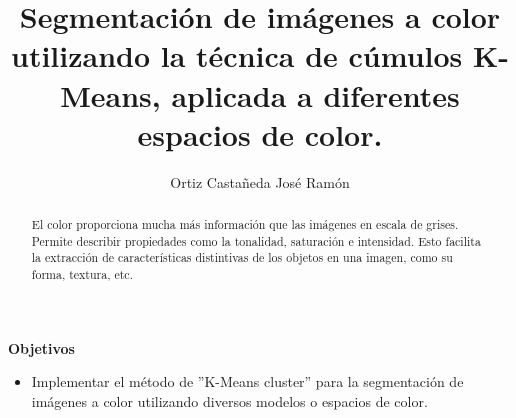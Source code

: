 \documentclass[
  journal=largetwo,
  manuscript=Practica-Adicional,
  year=2024-1,
  volume=37,
]{cup-journal}
\title{Segmentación de imágenes a color utilizando la técnica de cúmulos K-Means, aplicada a diferentes espacios de color.}
\author{Ortiz Castañeda José Ramón}
\affiliation{Facultad de Ciencias, UNAM
}
\begin{document}
\begin{abstract}
El color proporciona mucha más información que las imágenes en escala de grises. Permite describir propiedades como la tonalidad, saturación e intensidad. Esto facilita la extracción de características distintivas de los objetos en una imagen, como su forma, textura, etc.
\end{abstract}

\noindent \textbf{Objetivos}
\begin{itemize}
    \item Implementar el método de ''K-Means cluster'' para la segmentación de imágenes a color utilizando diversos modelos o espacios de color.
\end{itemize}







\printendnotes

\printbibliography
\end{document}
